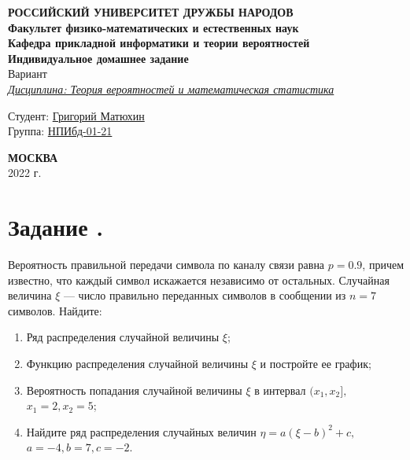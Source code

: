 \documentclass[12pt]{article}
\begin{document}
\begin{titlepage}

	\begin{center}
		\hfill \break
		\textbf{
			\large{РОССИЙСКИЙ УНИВЕРСИТЕТ ДРУЖБЫ НАРОДОВ}\\
			\normalsize{Факультет физико-математических и естественных наук}\\
			\normalsize{Кафедра прикладной информатики и теории вероятностей}\\
		}
		\vspace*{\fill}
		\Large{\textbf{Индивидуальное домашнее задание } \\ Вариант }
		\\
		\underline{\textit{\normalsize{Дисциплина: Теория вероятностей и математическая статистика}}}
		\vspace*{\fill}

	\end{center}

	\begin{flushright}
		Студент: \underline{Григорий Матюхин}\\ \vspace{0.5cm}
		Группа: \underline{НПИбд-01-21}
	\end{flushright}


	\begin{center} \textbf{МОСКВА} \\ 2022 г. \end{center}
	\thispagestyle{empty} %

\end{titlepage}
\newpage
\tableofcontents
\newpage

\section*{Задание .}
Вероятность правильной передачи символа по каналу связи равна $p = 0.9$, причем известно, что каждый символ искажается независимо от остальных.
Случайная величина $\xi$ --- число правильно переданных символов в сообщении из $n = 7$ символов. Найдите:
\begin{enumerate}
	\item Ряд распределения случайной величины $\xi$;
	\item Функцию распределения случайной величины $\xi$ и постройте ее график;
	\item Вероятность попадания случайной величины $\xi$ в интервал $(x_1, x_2],$ $ x_1 = 2, x_2 = 5$;
	\item Найдите ряд распределения случайных величин $\eta = a(\xi - b)^2 + c,$ $ a = -4, b = 7, c = -2$.
\end{enumerate}
\end{document}
